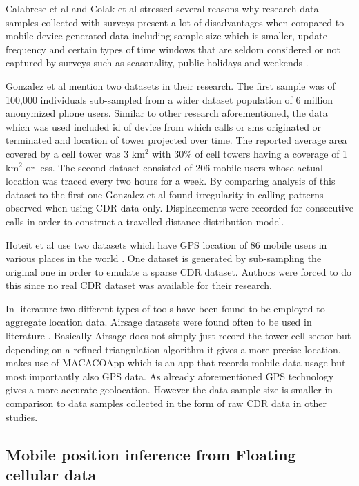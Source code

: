 \documentclass[12pt, a4paper]{report}
\theoremstyle{definition}
\theoremstyle{definition}%
\theoremstyle{definition}%
\theoremstyle{definition}%
\theoremstyle{definition}%
\theoremstyle{definition}%
\begin{document}
Calabrese et al and Colak et al stressed several reasons why research data samples collected with surveys present a lot of disadvantages when compared to mobile device generated data including sample size which is smaller, update frequency and certain types of time windows that are seldom considered or not captured by surveys such as seasonality, public holidays and weekends \cite{Calabrese2013,Colak2015}.   

Gonzalez et al mention two datasets in their research. The first sample was of 100,000 individuals sub-sampled from a wider dataset population of 6 million anonymized  phone users. Similar to other research aforementioned, the data which was used included id of device from which calls or sms originated or terminated and location of tower projected over time. The reported average area covered by a cell tower was 3 km$^{2}$ with 30\% of cell towers having a coverage of 1 km$^{2}$ or less. The second dataset consisted of 206 mobile users whose actual location was traced every two hours for a week. By comparing analysis of this dataset to the first one Gonzalez et al found irregularity in calling patterns observed when using CDR data only. Displacements were recorded for consecutive calls in order to construct a travelled distance distribution model.

Hoteit et al use two datasets which have GPS location of 86 mobile users in various places in the world \cite{Hoteit2016}. One dataset is generated by sub-sampling the original one in order to emulate a sparse CDR dataset. Authors were forced to do this since no real CDR dataset was available for their research.  

In literature two different types of tools have been found to be employed to aggregate location data. Airsage datasets were found often to be used in literature \cite{Hoteit2014, Wang2013, Calabrese2013,Leduc2008,Wang2012, Colak2015}. Basically Airsage does not simply just record the tower cell sector but depending on a refined triangulation algorithm it gives a more precise location.  \cite{Hoteit2016} makes use of MACACOApp which is an app that records mobile data usage but most importantly also GPS data. As already aforementioned GPS technology gives a more accurate geolocation. However the data sample size is smaller in comparison to data samples collected in the form of raw CDR data in other studies.

\subsection{Mobile position inference from Floating cellular data} \label{mobile_inference} 
\end{document}
